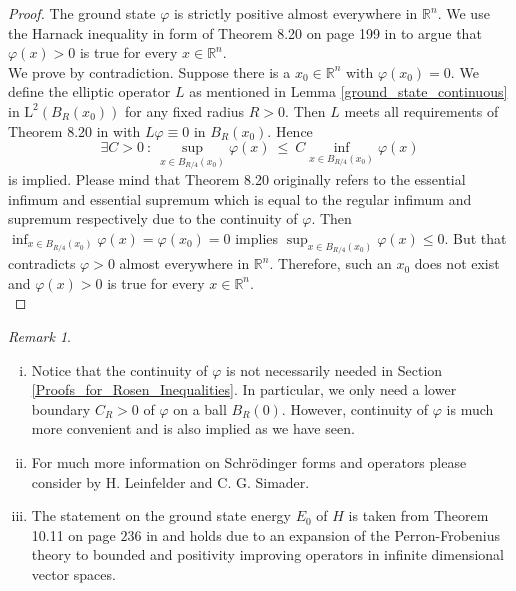 \documentclass[12pt,longbibliography]{article}
\def\R{\mathbb{R}}
\theoremstyle{definition}
\theoremstyle{remark}
\newtheorem{rem}[thm]{Remark}
\theoremstyle{example}
\begin{document}
\begin{proof}
The ground state $\varphi$ is strictly positive almost everywhere in $\R^{n}$. We use the Harnack inequality
in form of Theorem 8.20 on page 199 in \cite{GilbargTrudinger01} to argue that $\varphi(x) > 0$ is true for every $x \in \R^{n}$.\\

We prove by contradiction. Suppose there is a $x_{0} \in \R^{n}$ with $\varphi(x_{0})=0$.
We define the elliptic operator $L$ as mentioned in Lemma \ref{ground_state_continuous} 
in $\mathrm{L}^{2}\left( B_{R}(x_{0}) \right)$ for any fixed radius $R>0$. Then
$L$ meets all requirements of Theorem 8.20
in \cite{GilbargTrudinger01} with $L\varphi \equiv 0$ in $B_{R}(x_{0})$. Hence
\begin{equation} 
\exists C > 0 \ : \ \sup_{x \in B_{R/4}(x_{0})} \varphi(x) \ \leq \ C \inf_{x \in B_{R/4}(x_{0})} \varphi(x)
\end{equation}
is implied. Please mind that Theorem 8.20 originally refers to the essential infimum and essential supremum which is equal to
the regular infimum and supremum respectively due to the continuity of $\varphi$. Then 
$ \inf_{x \in B_{R/4}(x_{0})} \varphi(x) = \varphi(x_{0}) = 0$ implies $\sup_{x \in B_{R/4}(x_{0})} \varphi(x) \leq 0$. But that 
contradicts $\varphi > 0$ almost everywhere in $\R^{n}$. Therefore, such an $x_{0}$ does not exist and  $\varphi(x) > 0$ 
is true for every $x \in \R^{n}$.\\
\end{proof}

\begin{rem} \
\begin{enumerate}[i.)]
\item Notice that the continuity of $\varphi$ is not necessarily needed in Section \ref{Proofs_for_Rosen_Inequalities}. In particular,
we only need a lower boundary $C_{R} > 0$  of $\varphi$ on a ball $B_{R}(0)$. However, continuity of $\varphi$ is much more 
convenient and is also implied as we have seen.
\item For much more information on Schrödinger forms and operators please consider \cite{Leinfelder81} by  
H. Leinfelder and C. G. Simader.
\item The statement on the ground state energy $E_{0}$ of $H$ is taken from  Theorem 10.11 on page $236$ in \cite{Teschl09} and
holds due to an expansion of the Perron-Frobenius theory to bounded and positivity improving operators in infinite dimensional 
vector spaces.
\end{enumerate}
\end{rem}
\end{document}
